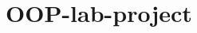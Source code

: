 \chapter{OOP-\/lab-\/project}
\hypertarget{md__r_e_a_d_m_e}{}\label{md__r_e_a_d_m_e}
\label{md__r_e_a_d_m_e_autotoc_md0}%
%
